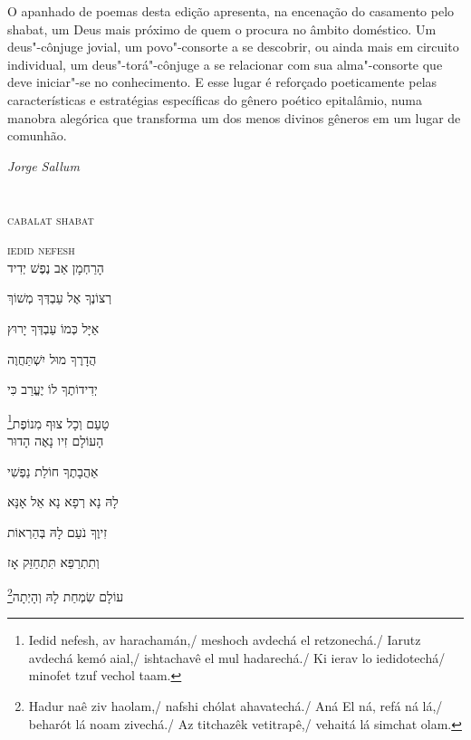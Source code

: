 O apanhado de poemas desta edição apresenta, na encenação do
casamento pelo shabat, um Deus mais próximo de quem o procura no âmbito
doméstico. Um deus"-cônjuge jovial, um povo"-consorte a se descobrir, ou
ainda mais em circuito individual, um deus"-torá"-cônjuge a se relacionar
com sua alma"-consorte que deve iniciar"-se no conhecimento. E esse lugar
é reforçado poeticamente pelas características e estratégias específicas
do gênero poético epitalâmio, numa manobra alegórica que transforma um
dos menos divinos gêneros em um lugar de comunhão.

\hfill{}\emph{Jorge Sallum}


\chapter*{}
\begin{center}
\begin{vplace}[0.3]
\Large
\textsc{cabalat shabat}
\end{vplace}
\end{center}
\thispagestyle{empty}

\begingroup
\movetoevenpage
\raggedleft

\vspace*{1cm}

\textsc{iedid nefesh}\\[15pt]

הָרַחְמָן אַב נֶפֶשׁ יְדִיד

רְצוֹנֶךָ אֶל עַבְדְּךָ מְשׁוֹךְ

אַיָּל כְּמוֹ עַבְדְּךָ יָרוּץ

הֲדָרֶךָ מוּל יִשְׁתַּחֲוֶה

יְדִידוֹתֶךָ לוֹ יֶעֱרַב  כִּי

\footnote{Iedid nefesh, av harachamán,/ meshoch avdechá el retzonechá./ Iarutz avdechá kemó aial,/ ishtachavê el mul hadarechá./ Ki ierav lo iedidotechá/ minofet tzuf vechol taam.}טָעַם וְכָל צוּף מִנוֹפֶת\\[10pt]

הָעוֹלָם זִיו נָאֶה הָדוּר

אַהֲבָתֶךָ חוֹלַת נַפְשִׁי

לָהּ נָא רְפָא נָא אֵל אָנָּא

זִיוֶךָ נֹעַם לָהּ בְּהַרְאוֹת

וְתִתְרַפֵּא תִּתְחַזֵּק אָז

\footnote{Hadur naê ziv haolam,/ nafshi chólat ahavatechá./ Aná El ná, refá ná lá,/ beharót lá noam zivechá./ Az titchazêk vetitrapê,/ vehaitá lá simchat olam.}עוֹלָם שִׂמְחַת לָהּ וְהָיְתָה\\[10pt]


